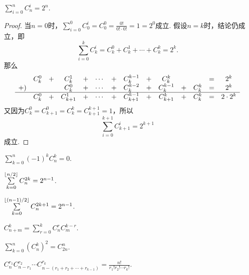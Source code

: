 \begin{property}\label{theorem:组合数性质3}
\(\sum\limits_{i=0}^n C_n^i = 2^n\).
\begin{proof}
当\(n=0\)时，\(\sum\limits_{i=0}^0 C_0^i = C_0^0 = \frac{0!}{0! \cdot 0!} = 1 = 2^0\)成立.
假设\(n=k\)时，结论仍成立，即\[
\sum\limits_{i=0}^k C_k^i
= C_k^0 + C_k^1 + \dotsb + C_k^k = 2^k.
\]那么\[
\begin{array}{*{14}{c}}
& C_k^0 &+& C_k^1 &+& \dotsb &+& C_k^{k-1} &+& C_k^k && &=& 2^k \\
+) & && C_k^0 &+& \dotsb &+& C_k^{k-2} &+& C_k^{k-1} &+& C_k^k &=& 2^k \\ \hline
& C_k^0 &+& C_{k+1}^1 &+& \dotsb &+& C_{k+1}^{k-1} &+& C_{k+1}^k &+& C_k^k &=& 2 \cdot 2^k
\end{array}
\]又因为\(C_k^0 = C_{k+1}^0 = C_k^k = C_{k+1}^{k+1} = 1\)，所以\[
\sum\limits_{i=0}^{k+1} C_{k+1}^i = 2^{k+1}
\]成立.
\end{proof}
\end{property}

\begin{property}\label{theorem:组合数性质4}
\(\sum\limits_{k=0}^n (-1)^k C_n^k = 0\).
\end{property}

\begin{property}\label{theorem:组合数性质5}
\(\sum\limits_{k=0}^{\lfloor n/2\rfloor} C_n^{2k} = 2^{n-1}\).
\end{property}
\begin{property}\label{theorem:组合数性质6}
\(\sum\limits_{k=0}^{\lfloor(n-1)/2\rfloor} C_n^{2k+1} = 2^{n-1}\).
\end{property}

\begin{property}\label{theorem:组合数性质7}
\(C_{n+m}^k = \sum\limits_{r=0}^{k} C_n^r C_m^{k-r}\).
\end{property}

\begin{property}\label{theorem:组合数性质8}
\(\sum\limits_{k=0}^n (C_n^k)^2 = C_{2n}^n\).
\end{property}

\begin{property}\label{theorem:组合数性质9}
\(C_n^{r_1} C_{n-r_1}^{r_2} \dotsm C_{n-(r_1+r_2+\dotsb+r_{k-1})}^{r_k}
= \frac{n!}{r_1! r_2! \dotsm r_k!}\).
\end{property}

